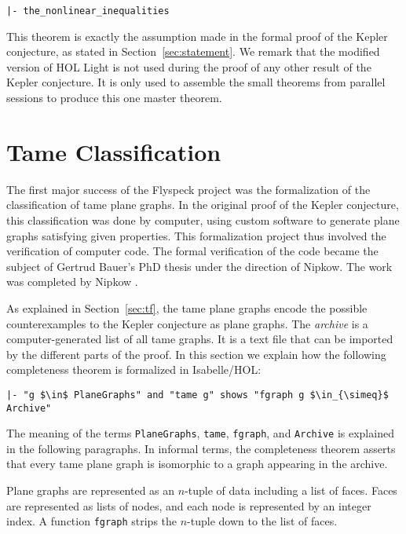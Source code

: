 \begin{Verbatim}[fontsize=\small]
|- the_nonlinear_inequalities
\end{Verbatim}

This theorem is exactly the assumption made in the formal proof of the
Kepler conjecture, as stated in Section~\ref{sec:statement}.  We
remark that the modified version of HOL Light is not used during the
proof of any other result of the Kepler conjecture.  It is only used
to assemble the small theorems from parallel sessions to produce this
one master theorem.

\section{Tame Classification}\label{sec:tc}


The first major success of the Flyspeck project was the formalization
of the classification of tame plane graphs. In the original proof of
the Kepler conjecture, this classification was done by computer, using
custom software to generate plane graphs satisfying given
properties. This formalization project thus involved the verification
of computer code. The formal verification of the code became the
subject of Gertrud Bauer's PhD thesis under the direction of
Nipkow. The work was completed by Nipkow \cite{NipkowBS-IJCAR06}.

As explained in Section~\ref{sec:tf}, the tame plane graphs encode
the possible counterexamples to the Kepler conjecture as plane
graphs. The {\it archive} is a computer-generated list of all tame
graphs. It is a text file that can be imported by the different parts
of the proof. In this section we explain how the following
completeness theorem is formalized in Isabelle/HOL:

\begin{lstlisting}[keepspaces=true,stringstyle=\tt,basicstyle=\small,%
frame=none,framesep=8pt,mathescape,morekeywords={and,shows},columns=flexible]
|- "g $\in$ PlaneGraphs" and "tame g" shows "fgraph g $\in_{\simeq}$ Archive"
\end{lstlisting}

The meaning of the
terms \verb!PlaneGraphs!, \verb!tame!, \verb!fgraph!, and
\verb!Archive! is explained in the following paragraphs.
In informal terms, the completeness theorem 
asserts that every tame plane graph is
isomorphic to a graph appearing in the archive.  

Plane graphs are represented as an
$n$-tuple of data including a list of faces. Faces are represented
as lists of nodes, and each node is represented by an integer index.
A function \verb!fgraph! strips the $n$-tuple down to the list of faces.

